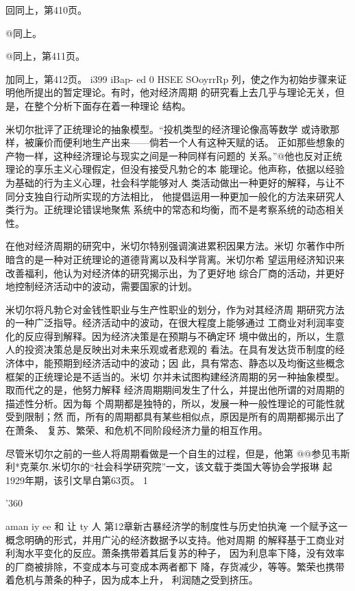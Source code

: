回同上，第410页。

@同上。

@同上，第411页。

加同上，第412页。
i399
iBap-
ed
0
HSEE
SOoyrrRp
列，使之作为初始步骤来证明他所提出的暂定理论。有时，他对经济周期
的研究看上去几乎与理论无关，但是，在整个分析下面存在着一种理论
结构。

米切尔批评了正统理论的抽象模型。“投机类型的经济理论像高等数学
或诗歌那样，被廉价而便利地生产出来——倘若一个人有这种天赋的话。
正如那些想象的产物一样，这种经济理论与现实之间是一种同样有问题的
关系。”@他也反对正统理论的享乐主义心理假定，但没有接受凡勃仑的本
能理论。他声称，依据以经验为基础的行为主义心理，社会科学能够对人
类活动做出一种更好的解释，与让不同分支独自行动所实现的方法相比，
他提倡运用一种更加一般化的方法来研究人类行为。正统理论错误地聚焦
系统中的常态和均衡，而不是考察系统的动态相关性。

在他对经济周期的研究中，米切尔特别强调演进累积因果方法。米切
尔著作中所暗含的是一种对正统理论的道德背离以及科学背离。米切尔希
望运用经济知识来改善福利，他认为对经济体的研究揭示出，为了更好地
综合厂商的活动，并更好地控制经济活动中的波动，需要国家的计划。

米切尔将凡勃仑对金钱性职业与生产性职业的划分，作为对其经济周
期研究方法的一种广泛指导。经济活动中的波动，在很大程度上能够通过
工商业对利润率变化的反应得到解释。因为经济决策是在预期与不确定环
境中做出的，所以，生意人的投资决策总是反映出对未来乐观或者悲观的
看法。在具有发达货币制度的经济体中，能预期到经济活动中的波动；因
此，具有常态、静态以及均衡这些概念框架的正统理论是不适当的。米切
尔并未试图构建经济周期的另一种抽象模型。取而代之的是，他努力解释
经济周期期间发生了什么，并提出他所谓的对周期的描述性分析。因为每
个周期都是独特的，所以，发展一种一般性理论的可能性就受到限制；然
而，所有的周期都具有某些相似点，原因是所有的周期都揭示出了在萧条、
复苏、繁荣、和危机不同阶段经济力量的相互作用。

尽管米切尔之前的一些人将周期看做是一个自生的过程，但是，他第
@@参见韦斯利*克莱尔.米切尔的“社会科学研究院”一文，该文载于类国大等协会学报琳
起1929年期，该引文旱白第63页。
1

'360

aman
iy
ee
和
让
ty
人
第12章新古暴经济学的制度性与历史怕执淹
一个赋予这一概念明确的形式，并用广沁的经济数据予以支持。他对周期
的解释基于工商业对利淘水平变化的反应。萧条携带着其后复苏的种子，
因为利息率下降，没有效率的厂商被排除，不变成本与可变成本两者都下
降，存货减少，等等。繁荣也携带着危机与萧条的种子，因为成本上升，
利润随之受到挤压。

